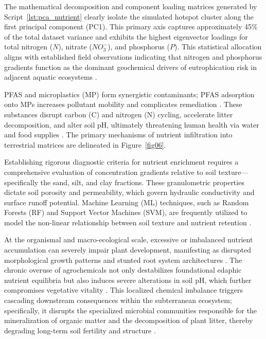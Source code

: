 \documentclass[land,article,submit,pdftex,moreauthors]{Definitions/mdpi}
\begin{document}
The mathematical decomposition and component loading matrices generated by Script~\ref{lst:pca_nutrient} clearly isolate the simulated hotspot cluster along the first principal component (PC1). This primary axis captures approximately 45\% of the total dataset variance and exhibits the highest eigenvector loadings for total nitrogen ($N$), nitrate ($NO_3^-$), and phosphorus ($P$). This statistical allocation aligns with established field observations indicating that nitrogen and phosphorus gradients function as the dominant geochemical drivers of eutrophication risk in adjacent aquatic ecosystems \cite{Pan2019,Guan2024,Xu2025}.

PFAS and microplastics (MP) form synergistic contaminants; PFAS adsorption
onto MPs increases pollutant mobility and complicates remediation
\cite{Shen2024}. These substances disrupt carbon (C) and nitrogen (N) cycling,
accelerate litter decomposition, and alter soil pH, ultimately threatening
human health via water and food supplies
\cite{Hossini2025,Appel2022,Cheng2025,Arnesdotter2025}. The primary mechanisms
of nutrient infiltration into terrestrial matrices are delineated in
Figure~\ref{fig06}.

Establishing rigorous diagnostic criteria for nutrient enrichment requires a
comprehensive evaluation of concentration gradients relative to soil
texture---specifically the sand, silt, and clay fractions. These granulometric
properties dictate soil porosity and permeability, which govern hydraulic
conductivity and surface runoff potential. Machine Learning (ML) techniques,
such as Random Forests (RF) and Support Vector Machines (SVM), are frequently
utilized to model the non-linear relationship between soil texture and nutrient
retention \cite{Zhang2021,He2022}. 

At the organismal and macro-ecological scale, excessive or imbalanced nutrient accumulation can severely impair plant development, manifesting as disrupted morphological growth patterns and stunted root system architectures \cite{Gang2004,Guo2021}. The chronic overuse of agrochemicals not only destabilizes foundational edaphic nutrient equilibria but also induces severe alterations in soil pH, which further compromises vegetative vitality \cite{Rahman2014}. This localized chemical imbalance triggers cascading downstream consequences within the subterranean ecosystem; specifically, it disrupts the specialized microbial communities responsible for the mineralization of organic matter and the decomposition of plant litter, thereby degrading long-term soil fertility and structure \cite{Atoloye2024}. 
\end{document}
